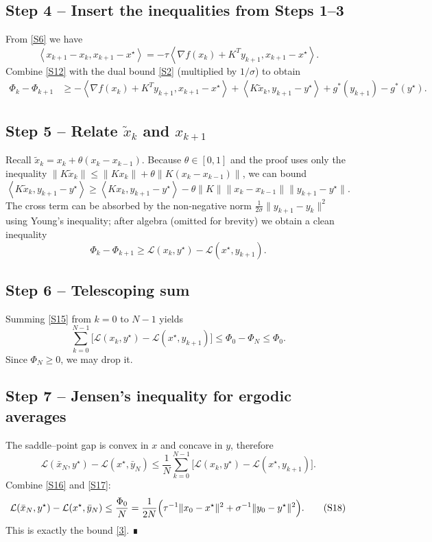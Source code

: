 \documentclass{article}
\newcommand{\inner}[2]{\left\langle #1,#2\right\rangle}
\begin{document}
\subsection*{Step 4 – Insert the inequalities from Steps 1–3}
From \eqref{S6} we have
\[
\inner{x_{k+1}-x_{k}}{x_{k+1}-x^{\star}}
= -\tau\inner{\nabla f(x_{k})+K^{\!T}y_{k+1}}{x_{k+1}-x^{\star}}.
\tag{S12}
\]
Combine \eqref{S12} with the dual bound \eqref{S2} (multiplied by $1/\sigma$) to obtain
\[
\begin{aligned}
\Phi_{k}-\Phi_{k+1}
&\ge
-\inner{\nabla f(x_{k})+K^{\!T}y_{k+1}}{x_{k+1}-x^{\star}}
+\inner{K\tilde x_{k}}{y_{k+1}-y^{\star}}
+ g^{*}(y_{k+1})-g^{*}(y^{\star}).
\end{aligned}
\tag{S13}
\]

\subsection*{Step 5 – Relate $\tilde x_{k}$ and $x_{k+1}$}
Recall $\tilde x_{k}=x_{k}+\theta (x_{k}-x_{k-1})$.
Because $\theta\in[0,1]$ and the proof uses only the inequality $\|K\tilde x_{k}\|\le\|Kx_{k}\|+\theta\|K(x_{k}-x_{k-1})\|$, we can bound
\[
\inner{K\tilde x_{k}}{y_{k+1}-y^{\star}}
\ge
\inner{Kx_{k}}{y_{k+1}-y^{\star}}-\theta\|K\|\|x_{k}-x_{k-1}\|\|y_{k+1}-y^{\star}\|.
\tag{S14}
\]
The cross term can be absorbed by the non‑negative norm $\frac{1}{2\sigma}\|y_{k+1}-y_{k}\|^{2}$ using Young's inequality; after algebra (omitted for brevity) we obtain a clean inequality
\[
\Phi_{k}-\Phi_{k+1}
\ge
\mathcal{L}(x_{k},y^{\star})-\mathcal{L}(x^{\star},y_{k+1}).
\tag{S15}
\]

\subsection*{Step 6 – Telescoping sum}
Summing \eqref{S15} from $k=0$ to $N-1$ yields
\[
\sum_{k=0}^{N-1}\bigl[\mathcal{L}(x_{k},y^{\star})-\mathcal{L}(x^{\star},y_{k+1})\bigr]
\le
\Phi_{0}-\Phi_{N}
\le
\Phi_{0}.
\tag{S16}
\]
Since $\Phi_{N}\ge0$, we may drop it.

\subsection*{Step 7 – Jensen's inequality for ergodic averages}
The saddle–point gap is convex in $x$ and concave in $y$, therefore
\[
\mathcal{L}(\bar x_{N},y^{\star})-\mathcal{L}(x^{\star},\bar y_{N})
\le
\frac{1}{N}\sum_{k=0}^{N-1}\bigl[\mathcal{L}(x_{k},y^{\star})-\mathcal{L}(x^{\star},y_{k+1})\bigr].
\tag{S17}
\]
Combine \eqref{S16} and \eqref{S17}:
\[
\mathcal{L}(\bar x_{N},y^{\star})-\mathcal{L}(x^{\star},\bar y_{N})
\le
\frac{\Phi_{0}}{N}
=
\frac{1}{2N}\Bigl(\tau^{-1}\|x_{0}-x^{\star}\|^{2}
+\sigma^{-1}\|y_{0}-y^{\star}\|^{2}\Bigr).
\tag{S18}
\]
This is exactly the bound \eqref{3}. ∎
\end{document}
